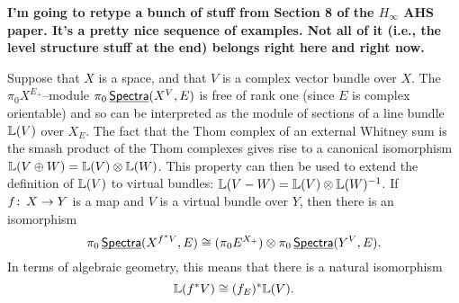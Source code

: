 \textbf{I'm going to retype a bunch of stuff from Section 8 of the $H_\infty$ AHS paper.  It's a pretty nice sequence of examples.  Not all of it (i.e., the level structure stuff at the end) belongs right here and right now.}

Suppose that $X$ is a space, and that $V$ is a complex vector bundle over $X$.  The $\pi_0 X^{E_+}$--module $\pi_0 \operatorname{\underline{\smash{\mathsf{Spectra}}}}(X^V, E)$ is free of rank one (since $E$ is complex orientable) and so can be interpreted as the module of sections of a line bundle $\mathbb{L}(V)$ over $X_E$.  The fact that the Thom complex of an external Whitney sum is the smash product of the Thom complexes gives rise to a canonical isomorphism $\mathbb{L}(V \oplus W) = \mathbb{L}(V) \otimes \mathbb{L}(W)$.  This property can then be used to extend the definition of $\mathbb{L}(V)$ to virtual bundles: $\mathbb{L}(V - W) = \mathbb{L}(V) \otimes \mathbb{L}(W)^{-1}$.  If $f \colon\thinspace X \to Y$ is a map and $V$ is a virtual bundle over $Y$, then there is an isomorphism \[\pi_0 \operatorname{\underline{\smash{\mathsf{Spectra}}}}(X^{f^* V}, E) \cong (\pi_0 E^{X_+}) \otimes \pi_0 \operatorname{\underline{\smash{\mathsf{Spectra}}}}(Y^V, E).\]  In terms of algebraic geometry, this means that there is a natural isomorphism \[\mathbb{L}(f^* V) \cong (f_E)^* \mathbb{L}(V).\]

